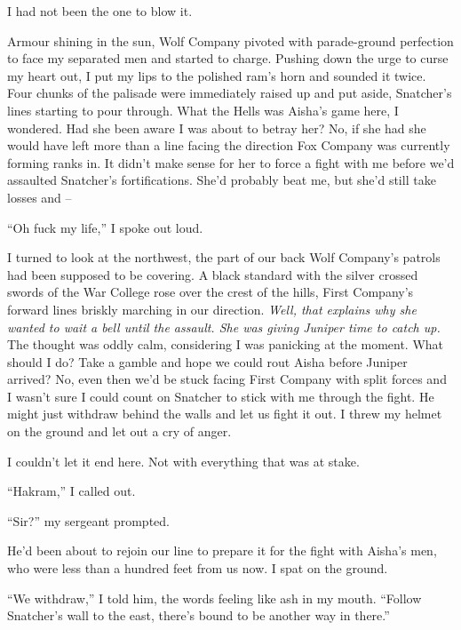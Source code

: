 \documentclass[12pt, openany]{book}
\begin{document}
I had not been the one to blow it.

Armour shining in the sun, Wolf Company pivoted with parade-ground perfection to face my separated men and started to charge. Pushing down the urge to curse my heart out, I put my lips to the polished ram’s horn and sounded it twice. Four chunks of the palisade were immediately raised up and put aside, Snatcher’s lines starting to pour through. What the Hells was Aisha’s game here, I wondered. Had she been aware I was about to betray her? No, if she had she would have left more than a line facing the direction Fox Company was currently forming ranks in. It didn’t make sense for her to force a fight with me before we’d assaulted Snatcher’s fortifications. She’d probably beat me, but she’d still take losses and –

“Oh fuck my life,” I spoke out loud.

I turned to look at the northwest, the part of our back Wolf Company’s patrols had been supposed to be covering. A black standard with the silver crossed swords of the War College rose over the crest of the hills, First Company’s forward lines briskly marching in our direction. \textit{Well, that explains why she wanted to wait a bell until the assault. She was giving Juniper time to catch up.} The thought was oddly calm, considering I was panicking at the moment. What should I do? Take a gamble and hope we could rout Aisha before Juniper arrived? No, even then we’d be stuck facing First Company with split forces and I wasn’t sure I could count on Snatcher to stick with me through the fight. He might just withdraw behind the walls and let us fight it out. I threw my helmet on the ground and let out a cry of anger.

I couldn’t let it end here. Not with everything that was at stake.

“Hakram,” I called out.

“Sir?” my sergeant prompted. 

He’d been about to rejoin our line to prepare it for the fight with Aisha’s men, who were less than a hundred feet from us now. I spat on the ground.

“We withdraw,” I told him, the words feeling like ash in my mouth. “Follow Snatcher’s wall to the east, there’s bound to be another way in there.”
\end{document}
